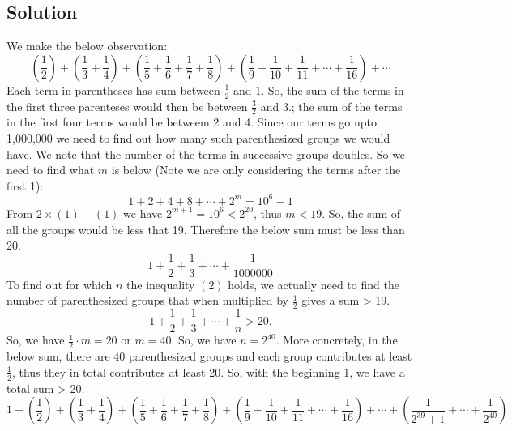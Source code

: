 \documentclass[12pt]{article}
\begin{document}
\subsection*{Solution}
We make the below observation:
\[
	\left( \frac{1}{2} \right) + \left( \frac{1}{3} + \frac{1}{4} \right) + \left( \frac{1}{5} + \frac{1}{6} + \frac{1}{7} + \frac{1}{8} \right) + \left( \frac{1}{9} + \frac{1}{10} + \frac{1}{11} + \cdots + \frac{1}{16} \right) + \cdots
\]
Each term in parentheses has sum between $\frac{1}{2}$ and 1. So, the sum of the terms in the first three parenteses would then be between $\frac{3}{2}$ and 3.; the sum of the terms in the first four terms would be betweem 2 and 4. Since our terms go upto 1,000,000 we need to find out how many such parenthesized groups we would have. We note that the number of the terms in successive groups doubles. So we need to find what $m$ is below (Note we are only considering the terms after the first 1):
\setcounter{equation}{0}
\begin{equation}
1 + 2 + 4 + 8 + \cdots + 2^m = 10^6-1
\end{equation}
From $2 \times (1) - (1)$ we have $2^{m+1} = 10^6 < 2^{20}$, thus $m < 19$. So, the sum of all the groups would be less that 19. Therefore the below sum must be less than 20.
\[
	1 + \frac{1}{2} + \frac{1}{3} + \cdots + \frac{1}{1000000}
\]
To find out for which $n$ the inequality $(2)$ holds, we actually need to find the number of parenthesized groups that when multiplied by $\frac{1}{2}$ gives a sum > 19.
\begin{equation}
	1 + \frac{1}{2} + \frac{1}{3} + \cdots + \frac{1}{n} > 20.
\end{equation}
So, we have $\frac{1}{2} \cdot m = 20$ or $m = 40$. So, we have $n = 2^{40}$. More concretely, in the below sum, there are $40$ parenthesized groups and each group contributes at least $\frac{1}{2}$, thus they in total contributes at least 20. So, with the beginning 1, we have a total sum > 20.
\[
	1 + \left( \frac{1}{2} \right) + \left( \frac{1}{3} + \frac{1}{4} \right) + \left( \frac{1}{5} + \frac{1}{6} + \frac{1}{7} + \frac{1}{8} \right) + \left( \frac{1}{9} + \frac{1}{10} + \frac{1}{11} + \cdots + \frac{1}{16} \right) + \cdots + \left( \frac{1}{2^{39}+1} + \cdots + \frac{1}{2^{40}} \right)
\]
\end{document}
